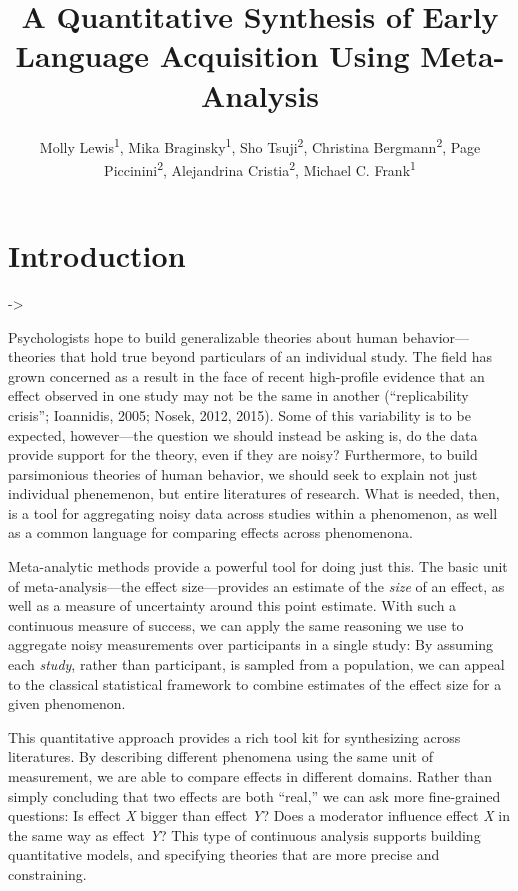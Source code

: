 \documentclass[american,floatsintext,man]{apa6}
\title{A Quantitative Synthesis of Early Language Acquisition Using
Meta-Analysis}
\author{
          Molly Lewis\textsuperscript{1},
          Mika Braginsky\textsuperscript{1},
          Sho Tsuji\textsuperscript{2},
          Christina Bergmann\textsuperscript{2},
          Page Piccinini\textsuperscript{2},
          Alejandrina Cristia\textsuperscript{2},
          Michael C. Frank\textsuperscript{1}  }
\affiliation{
    \vspace{0.5cm}
          \textsuperscript{1} Department Psychology, Stanford University\\
          \textsuperscript{2} Laboratoire de Sciences Cognitives et Psycholinguistique, ENS  }
\begin{document}
\maketitle



\section{Introduction}\label{introduction}

-\textgreater{}

Psychologists hope to build generalizable theories about human
behavior---theories that hold true beyond particulars of an individual
study. The field has grown concerned as a result in the face of recent
high-profile evidence that an effect observed in one study may not be
the same in another (``replicability crisis''; Ioannidis, 2005; Nosek,
2012, 2015). Some of this variability is to be expected, however---the
question we should instead be asking is, do the data provide support for
the theory, even if they are noisy? Furthermore, to build parsimonious
theories of human behavior, we should seek to explain not just
individual phenemenon, but entire literatures of research. What is
needed, then, is a tool for aggregating noisy data across studies within
a phenomenon, as well as a common language for comparing effects across
phenomenona.

Meta-analytic methods provide a powerful tool for doing just this. The
basic unit of meta-analysis---the effect size---provides an estimate of
the \emph{size} of an effect, as well as a measure of uncertainty around
this point estimate. With such a continuous measure of success, we can
apply the same reasoning we use to aggregate noisy measurements over
participants in a single study: By assuming each \emph{study}, rather
than participant, is sampled from a population, we can appeal to the
classical statistical framework to combine estimates of the effect size
for a given phenomenon.

This quantitative approach provides a rich tool kit for synthesizing
across literatures. By describing different phenomena using the same
unit of measurement, we are able to compare effects in different
domains. Rather than simply concluding that two effects are both
``real,'' we can ask more fine-grained questions: Is effect \emph{X}
bigger than effect \emph{Y}? Does a moderator influence effect \emph{X}
in the same way as effect \emph{Y}? This type of continuous analysis
supports building quantitative models, and specifying theories that are
more precise and constraining.
\end{document}
